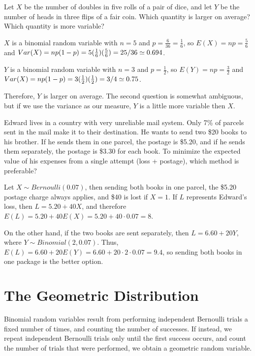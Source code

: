 \begin{examp} Let $X$ be the number of doubles in five rolls of a pair of dice, and let $Y$ be the number of heads in three flips of a fair coin. Which quantity is larger on average? Which quantity is more variable?
\par
\noindent $X$ is a binomial random variable with $n = 5$ and $p = \frac{6}{36} = \frac{1}{6}$, so $E(X) = np = \frac{5}{6}$ and $Var(X) = np(1-p) = 5(\frac{1}{6})(\frac{5}{6}) = 25/36 \simeq 0.694$.
\par
\noindent $Y$ is a binomial random variable with $n = 3$ and $p = \frac{1}{2}$, so $E(Y) = np = \frac{3}{2}$ and $Var(X) = np(1-p) = 3(\frac{1}{2})(\frac{1}{2}) = 3/4 \simeq 0.75$.
\par
\noindent Therefore, $Y$ is larger on average. The second question is somewhat ambiguous, but if we use the variance as our measure, $Y$ is a little more variable then $X$.
\end{examp}

\begin{examp}Edward lives in a country with very unreliable mail system. Only 7\% of parcels sent in the mail make it to their destination. He wants to send two \$20 books to his brother. If he sends them in one parcel, the postage is \$5.20, and if he sends them separately, the postage is \$3.30 for each book. To minimize the expected value of his expenses from a single attempt (loss + postage), which method is preferable?
\par
\noindent Let $X \sim Bernoulli(0.07)$, then sending both books in one parcel, the \$5.20 postage charge always applies, and \$40 is lost if $X = 1$. If $L$ represents Edward's loss, then $L = 5.20 + 40X$, and therefore $E(L) = 5.20 + 40E(X) = 5.20 + 40 \cdot 0.07 = 8$.
\par
\noindent On the other hand, if the two books are sent separately, then $L = 6.60 + 20Y$, where $Y \sim Binomial(2,0.07)$. Thus, $E(L) = 6.60 + 20E(Y) = 6.60 + 20 \cdot 2 \cdot 0.07 = 9.4$, so sending both books in one package is the better option.


\end{examp}

\section{The Geometric Distribution}\label{GeometricDist}

Binomial random variables result from performing independent Bernoulli trials a fixed number of times, and counting the number of successes. If instead, we repeat independent Bernoulli trials only until the first success occurs, and count the number of trials that were performed, we obtain a geometric random variable.

